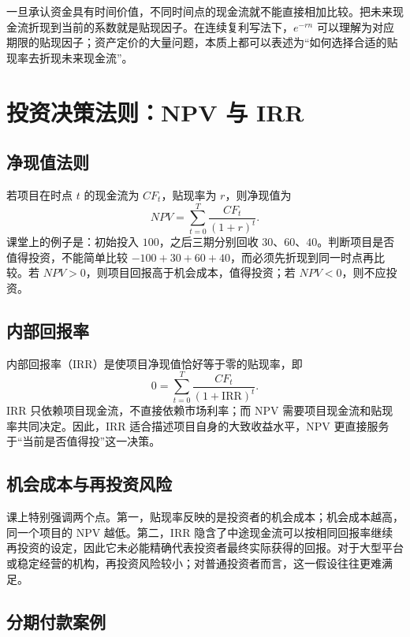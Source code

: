 \documentclass[UTF8,11pt,a4paper]{ctexart}
\begin{document}
一旦承认资金具有时间价值，不同时间点的现金流就不能直接相加比较。把未来现金流折现到当前的系数就是贴现因子。在连续复利写法下，$e^{-rn}$ 可以理解为对应期限的贴现因子；资产定价的大量问题，本质上都可以表述为“如何选择合适的贴现率去折现未来现金流”。

\section{投资决策法则：NPV 与 IRR}

\subsection{净现值法则}

若项目在时点 $t$ 的现金流为 $CF_t$，贴现率为 $r$，则净现值为
\begin{equation}
  NPV = \sum_{t=0}^{T} \frac{CF_t}{(1+r)^t}.
\end{equation}
课堂上的例子是：初始投入 $100$，之后三期分别回收 $30$、$60$、$40$。判断项目是否值得投资，不能简单比较 $-100 + 30 + 60 + 40$，而必须先折现到同一时点再比较。若 $NPV > 0$，则项目回报高于机会成本，值得投资；若 $NPV < 0$，则不应投资。

\subsection{内部回报率}

内部回报率（IRR）是使项目净现值恰好等于零的贴现率，即
\begin{equation}
  0 = \sum_{t=0}^{T} \frac{CF_t}{(1+\mathrm{IRR})^t}.
\end{equation}
IRR 只依赖项目现金流，不直接依赖市场利率；而 NPV 需要项目现金流和贴现率共同决定。因此，IRR 适合描述项目自身的大致收益水平，NPV 更直接服务于“当前是否值得投”这一决策。

\subsection{机会成本与再投资风险}

课上特别强调两个点。第一，贴现率反映的是投资者的机会成本；机会成本越高，同一个项目的 NPV 越低。第二，IRR 隐含了中途现金流可以按相同回报率继续再投资的设定，因此它未必能精确代表投资者最终实际获得的回报。对于大型平台或稳定经营的机构，再投资风险较小；对普通投资者而言，这一假设往往更难满足。

\subsection{分期付款案例}
\end{document}
